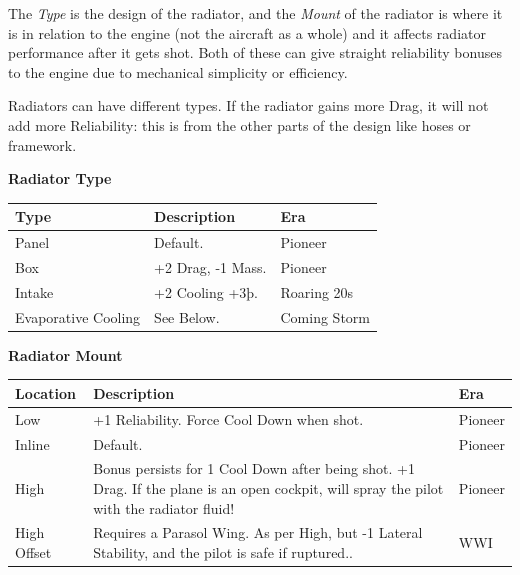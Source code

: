 \documentclass{article}
\begin{document}
The \emph{Type }is the design of the radiator, and the \emph{Mount} of
the radiator is where it is in relation to the engine (not the aircraft
as a whole) and it affects radiator performance after it gets shot. Both
of these can give straight reliability bonuses to the engine due to
mechanical simplicity or efficiency.

Radiators can have different types. If the radiator gains more Drag, it
will not add more Reliability: this is from the other parts of the
design like hoses or framework.

\textbf{Radiator Type}

\begin{tabular}{|l|l|l|}
    \hline
    Type                & Description       & Era          \\\hline
    Panel               & Default.          & Pioneer      \\\hline
    Box                 & +2 Drag, -1 Mass. & Pioneer      \\\hline
    Intake              & +2 Cooling +3þ.   & Roaring 20s  \\\hline
    Evaporative Cooling & See Below.        & Coming Storm \\\hline
\end{tabular}

\textbf{Radiator Mount}

\begin{tabular}{|l|l|l|}
    \hline
    Location                                       & Description                                                      & Era     \\\hline
    Low                                            & +1 Reliability. Force Cool Down when shot.                       & Pioneer \\\hline
    Inline                                         & Default.                                                         & Pioneer \\\hline
    High                                           & Bonus persists for 1 Cool Down after being shot. +1 Drag. If the
    plane is an open cockpit, will spray the pilot with the radiator fluid!
                                                   & Pioneer                                                                    \\\hline
    High Offset                                    & Requires a Parasol Wing. As per High, but -1 Lateral
    Stability, and the pilot is safe if ruptured.. & WWI                                                                        \\\hline
\end{tabular}
\end{document}
